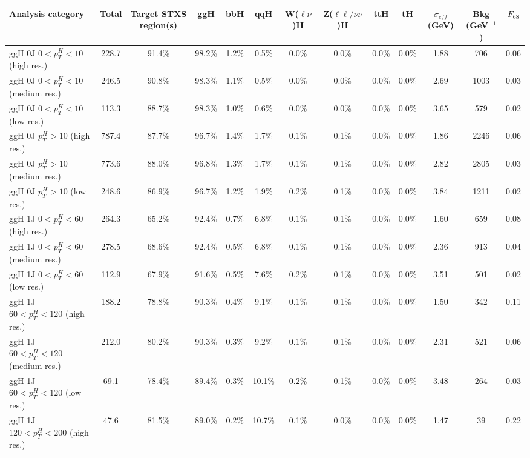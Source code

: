 \begin{table}
\label{tab:summary_table}
\begin{tabular}{lcccccccccccc}
\toprule
Analysis category & Total & Target STXS region(s) & ggH & bbH & qqH & W($\ell\nu$)H & Z($\ell\ell/\nu\nu$)H & ttH & tH & $\sigma_{eff}$ (GeV) & Bkg (GeV$^{-1}$) & $F_{68}$ \\
\midrule
ggH 0J $0 < p_{T}^{H} < 10$ (high res.) & 228.7 & 91.4\% & 98.2\% & 1.2\% & 0.5\% & 0.0\% & 0.0\% & 0.0\% & 0.0\% & 1.88 & 706 & 0.06 \\
ggH 0J $0 < p_{T}^{H} < 10$ (medium res.) & 246.5 & 90.8\% & 98.3\% & 1.1\% & 0.5\% & 0.0\% & 0.0\% & 0.0\% & 0.0\% & 2.69 & 1003 & 0.03 \\
ggH 0J $0 < p_{T}^{H} < 10$ (low res.) & 113.3 & 88.7\% & 98.3\% & 1.0\% & 0.6\% & 0.0\% & 0.0\% & 0.0\% & 0.0\% & 3.65 & 579 & 0.02 \\
ggH 0J $p_{T}^{H} > 10$ (high res.) & 787.4 & 87.7\% & 96.7\% & 1.4\% & 1.7\% & 0.1\% & 0.1\% & 0.0\% & 0.0\% & 1.86 & 2246 & 0.06 \\
ggH 0J $p_{T}^{H} > 10$ (medium res.) & 773.6 & 88.0\% & 96.8\% & 1.3\% & 1.7\% & 0.1\% & 0.1\% & 0.0\% & 0.0\% & 2.82 & 2805 & 0.03 \\
ggH 0J $p_{T}^{H} > 10$ (low res.) & 248.6 & 86.9\% & 96.7\% & 1.2\% & 1.9\% & 0.2\% & 0.1\% & 0.0\% & 0.0\% & 3.84 & 1211 & 0.02 \\
ggH 1J $0 < p_{T}^{H} < 60$ (high res.) & 264.3 & 65.2\% & 92.4\% & 0.7\% & 6.8\% & 0.1\% & 0.1\% & 0.0\% & 0.0\% & 1.60 & 659 & 0.08 \\
ggH 1J $0 < p_{T}^{H} < 60$ (medium res.) & 278.5 & 68.6\% & 92.4\% & 0.5\% & 6.8\% & 0.1\% & 0.1\% & 0.0\% & 0.0\% & 2.36 & 913 & 0.04 \\
ggH 1J $0 < p_{T}^{H} < 60$ (low res.) & 112.9 & 67.9\% & 91.6\% & 0.5\% & 7.6\% & 0.2\% & 0.1\% & 0.0\% & 0.0\% & 3.51 & 501 & 0.02 \\
ggH 1J $60 < p_{T}^{H} < 120$ (high res.) & 188.2 & 78.8\% & 90.3\% & 0.4\% & 9.1\% & 0.1\% & 0.1\% & 0.0\% & 0.0\% & 1.50 & 342 & 0.11 \\
ggH 1J $60 < p_{T}^{H} < 120$ (medium res.) & 212.0 & 80.2\% & 90.3\% & 0.3\% & 9.2\% & 0.1\% & 0.1\% & 0.0\% & 0.0\% & 2.31 & 521 & 0.06 \\
ggH 1J $60 < p_{T}^{H} < 120$ (low res.) & 69.1 & 78.4\% & 89.4\% & 0.3\% & 10.1\% & 0.2\% & 0.1\% & 0.0\% & 0.0\% & 3.48 & 264 & 0.03 \\
ggH 1J $120 < p_{T}^{H} < 200$ (high res.) & 47.6 & 81.5\% & 89.0\% & 0.2\% & 10.7\% & 0.1\% & 0.0\% & 0.0\% & 0.0\% & 1.47 & 39 & 0.22 \\

\end{tabular}
\end{table}
